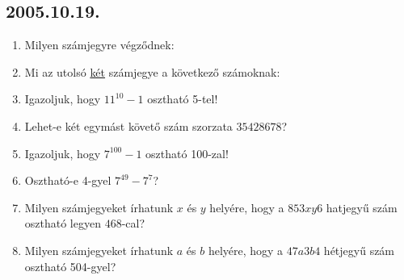 \subsection*{2005.10.19.}
\begin{enumerate}
 
\item Milyen számjegyre végződnek:


\item Mi az utolsó \underline{két} számjegye a következő számoknak:


\item Igazoljuk, hogy $11^{10}-1$ osztható 5-tel!

\item Lehet-e két egymást követő szám szorzata $35428678$?

\item Igazoljuk, hogy $7^{100}-1$ osztható 100-zal!

\item Osztható-e 4-gyel $7^{49}-7^7$?

\item Milyen számjegyeket írhatunk $x$ és $y$ helyére, hogy a $853xy6$ hatjegyű szám osztható legyen $468$-cal?

\item Milyen számjegyeket írhatunk $a$ és $b$ helyére, hogy a $47a3b4$ hétjegyű szám osztható 504-gyel?

\end{enumerate}

